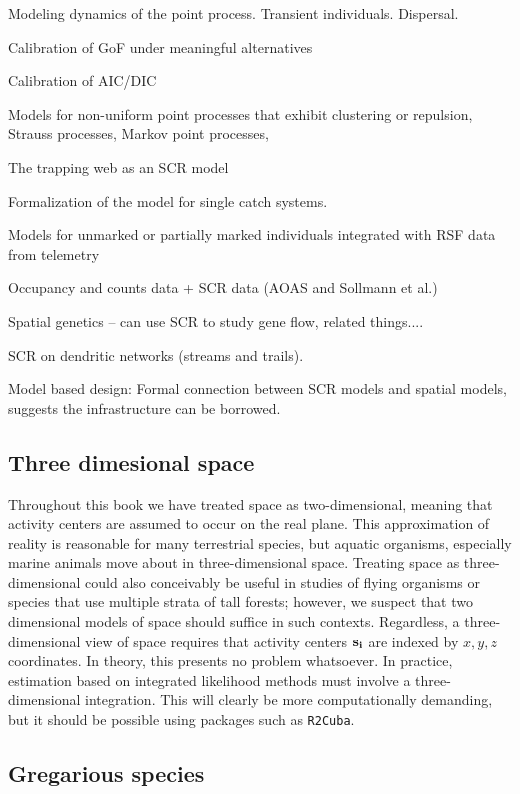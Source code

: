 Modeling dynamics of the point process. Transient individuals. 
Dispersal. 

Calibration of GoF under meaningful alternatives

Calibration of AIC/DIC 

Models for non-uniform point processes that exhibit clustering or
repulsion, Strauss processes, Markov point processes, 

The trapping web as an SCR model 

Formalization of the model for single catch systems. 

Models for unmarked or partially marked individuals integrated with
RSF data from telemetry

Occupancy and counts data + SCR data (AOAS and Sollmann et al.)

Spatial genetics  -- can use SCR to study gene flow, related things....

SCR on dendritic networks (streams and trails).

Model based design: Formal connection between SCR models and spatial
models, suggests the infrastructure can be borrowed.

\subsection{Three dimesional space}

Throughout this book we have treated space as
two-dimensional, meaning that activity centers are assumed to occur on
the real plane. This approximation of reality is reasonable for many
terrestrial species, but aquatic organisms, especially marine animals
move about in three-dimensional space. Treating space as
three-dimensional could also conceivably be useful in studies of flying organisms
or species that use multiple strata of tall forests; however, we
suspect that two dimensional models of space should suffice in such
contexts. Regardless, a three-dimensional view of space requires that
activity centers $\bf s_i$ are indexed by
$x,y,z$ coordinates. In theory, this presents no problem whatsoever. In
practice, estimation based on integrated likelihood methods must
involve a three-dimensional integration. This will clearly be more
computationally demanding, but it should be possible using packages
such as {\tt R2Cuba}.




\subsection{Gregarious species}

